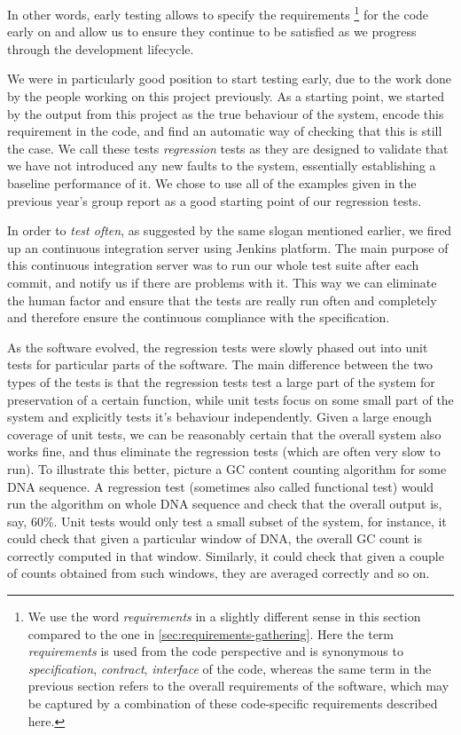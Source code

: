 In other words, early testing allows to specify the requirements
    \footnote{We use the word \emph{requirements} in a slightly different sense in this section compared to the one in \autoref{sec:requirements-gathering}. 
    Here the term \emph{requirements} is used from the code perspective and is synonymous to \emph{specification}, \emph{contract}, \emph{interface} of the code, whereas the same term in the previous section refers to the overall requirements of the software, which may be captured by a combination of these code-specific requirements described here.} 
for the code early on and allow us to ensure they continue to be satisfied as we progress through the development lifecycle. 


We were in particularly good position to start testing early, due to the work done by the people working on this project previously. 
As a starting point, we started by the output from this project as the true behaviour of the system, encode this requirement in the code, and find an automatic way of checking that this is still the case. 
We call these tests \emph{regression} tests as they are designed to validate that we have not introduced any new faults to the system,
essentially establishing a baseline performance of it.
We chose to use all of the examples given in the previous year's group report as a good starting point of our regression tests.

In order to \emph{test often}, as suggested by the same slogan mentioned earlier, we fired up an continuous integration server using Jenkins platform\cite{_jenkins_????}. The main purpose of this continuous integration server was to run our whole test suite after each commit, and notify us if there are problems with it. 
This way we can eliminate the human factor and ensure that the tests are really run often and completely and therefore ensure the continuous compliance with the specification.

As the software evolved, the regression tests were slowly phased out into unit tests for particular parts of the software. The main difference between the two types of the tests is that the regression tests test a large part of the system for preservation of a certain function, while unit tests focus on some small part of the system and explicitly tests it's behaviour independently. Given a large enough coverage of unit tests, we can be reasonably certain that the overall system also works fine, and thus eliminate the regression tests (which are often very slow to run). To illustrate this better, picture a GC content counting algorithm for some DNA sequence. 
A regression test (sometimes also called functional test) would run the algorithm on whole DNA sequence and check that the overall output is, say, 60\%. 
Unit tests would only test a small subset of the system, for instance, it could check that given a particular window of DNA, the overall GC count is correctly computed in that window. Similarly, it could check that given a couple of counts obtained from such windows, they are averaged correctly and so on. 

